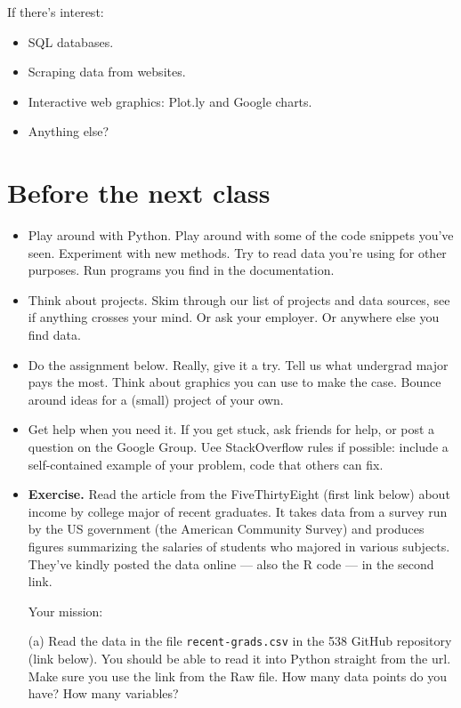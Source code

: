 \documentclass[11pt]{article}
\begin{document}
If there's interest:
\begin{itemize}
\item SQL databases.
\item Scraping data from websites.
\item Interactive web graphics:  Plot.ly and Google charts.
\item Anything else?
\end{itemize}

\section{Before the next class}

\begin{itemize}
\item Play around with Python.
Play around with some of the code snippets you've seen.
Experiment with new methods.
Try to read data you're using for other purposes.
Run programs you find in the documentation.

\item Think about projects.
Skim through our list of projects and data sources, see if anything crosses your mind.
Or ask your employer.  Or anywhere else you find data.

\item Do the assignment below.  Really, give it a try.  Tell us what undergrad major pays the most.
Think about graphics you can use to make the case.
Bounce around ideas for a (small) project of your own.

\item Get help when you need it.
If you get stuck, ask friends for help, or post a question on the Google Group.
Uee StackOverflow rules if possible:  include a self-contained example of your problem, code that others can fix.

\item {\bf Exercise.}
Read the article from the FiveThirtyEight (first link below) about income
by college major of recent graduates.
It takes data from a survey run by the US government (the American Community Survey) and
produces figures summarizing the salaries of students who majored in
various subjects.  They've kindly posted the data online --- also the R
code --- in the second link.

Your mission:

(a) Read the data in the file {\tt recent-grads.csv} in the 538 GitHub
repository (link below).
You should be able to read it into Python straight from the url.
Make sure you use the link from the Raw file.
How many data points do you have?  How many
variables?


\end{itemize}
\end{document}
